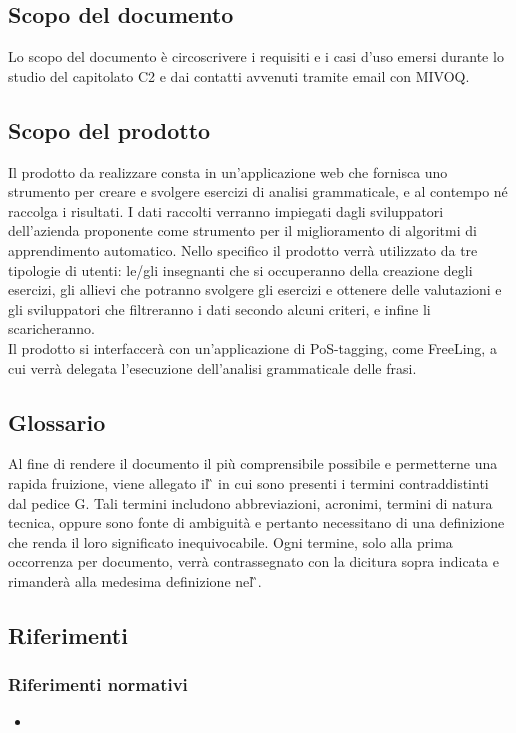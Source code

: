 \subsection{Scopo del documento}
Lo scopo del documento è circoscrivere i requisiti e i casi d’uso emersi durante lo studio del capitolato C2 e dai contatti avvenuti tramite email con MIVOQ.
\subsection{Scopo del prodotto}
Il prodotto da realizzare consta in un’applicazione web che fornisca uno strumento per creare e svolgere esercizi di analisi grammaticale, e al contempo né raccolga i risultati. I dati raccolti verranno impiegati dagli sviluppatori dell’azienda proponente come strumento per il miglioramento di algoritmi di {apprendimento automatico}. Nello specifico il prodotto verrà utilizzato da tre tipologie di utenti:
le/gli insegnanti che si occuperanno della creazione degli esercizi,
gli allievi che potranno svolgere gli esercizi e ottenere delle valutazioni e gli sviluppatori che filtreranno i dati secondo alcuni criteri, e infine li scaricheranno.\\Il prodotto si interfaccerà con un’applicazione di {PoS-tagging}, come {FreeLing}, a cui verrà delegata l’esecuzione dell’analisi grammaticale delle frasi.
\subsection{Glossario}
Al fine di rendere il documento il più comprensibile possibile e permetterne una rapida fruizione, viene allegato il \G{} in cui sono presenti i termini contraddistinti dal pedice G. Tali termini includono abbreviazioni, acronimi, termini di natura tecnica, oppure sono fonte di ambiguità e pertanto necessitano di una definizione che renda il loro significato inequivocabile. 
Ogni termine, solo alla prima occorrenza per documento, verrà contrassegnato con la dicitura sopra indicata e rimanderà alla medesima definizione nel \G{}.
\subsection{Riferimenti}
\subsubsection{Riferimenti normativi}
\begin{itemize}
\item \NdPv
\end{itemize}
